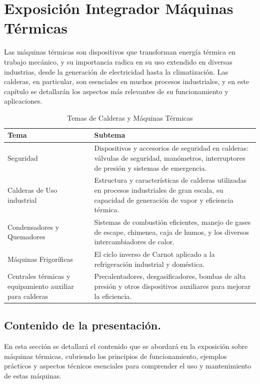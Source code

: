 \documentclass[../main]{subfiles}
\begin{document}
\chapter*{Exposición Integrador Máquinas Térmicas}

Las máquinas térmicas son dispositivos que transforman energía térmica en trabajo mecánico, y su importancia radica en su uso extendido en diversas industrias, desde la generación de electricidad hasta la climatización. Las calderas, en particular, son esenciales en muchos procesos industriales, y en este capítulo se detallarán los aspectos más relevantes de su funcionamiento y aplicaciones.

    \begin{table}[h!]
        \centering
        \begin{tabular}{|p{5cm} | p{10cm} |} \hline
            Tema & Subtema \\ \hline \hline 
             Seguridad & Dispositivos y accesorios de seguridad en calderas: válvulas de seguridad, manómetros, interruptores de presión y sistemas de emergencia.\\ \hline 
             Calderas de Uso industrial & Estructura y características de calderas utilizadas en procesos industriales de gran escala, su capacidad de generación de vapor y eficiencia térmica. \\ \hline
             Condensadores y Quemadores & Sistemas de combustión eficientes, manejo de gases de escape, chimenea, caja de humos, y los diversos intercambiadores de calor.\\ \hline
             Máquinas Frigoríficas& El ciclo inverso de Carnot aplicado a la refrigeración industrial y doméstica.\\ \hline
             Centrales térmicas y equipamiento auxiliar para calderas& Precalentadores, desgasificadores, bombas de alta presión y otros dispositivos auxiliares para mejorar la eficiencia.\\ \hline 
        \end{tabular}
        \caption{Temas de Calderas y Máquinas Térmicas}
    \end{table}

\section{Contenido de la presentación.}
En esta sección se detallará el contenido que se abordará en la exposición sobre máquinas térmicas, cubriendo los principios de funcionamiento, ejemplos prácticos y aspectos técnicos esenciales para comprender el uso y mantenimiento de estas máquinas.
\end{document}
